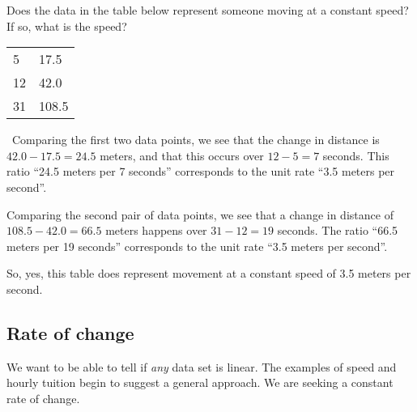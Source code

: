 
\begin{boxex}
Does the data in the table below represent someone moving at a constant speed? If so, what is the speed?

\begin{center}
\begin{tabular}{|C{2cm}|C{2cm}|}
\hline
{} & \\ & 17.5\\
12 & 42.0\\
31 & 108.5\\\hline
\end{tabular}
\end{center}

\exsoln\ Comparing the first two data points, we see that the change in distance is $42.0 - 17.5 = 24.5$ meters, and that this occurs over $12-5=7$ seconds. This ratio ``24.5 meters per 7 seconds'' corresponds to the unit rate ``3.5 meters per second''.

Comparing the second pair of data points, we see that a change in distance of $108.5-42.0 = 66.5$ meters happens over $31-12 = 19$ seconds. The ratio ``66.5 meters per 19 seconds'' corresponds to the unit rate ``3.5 meters per second''.

So, yes, this table does represent movement at a constant speed of 3.5 meters per second.
\end{boxex}


\subsection{Rate of change}

We want to be able to tell if \textit{any} data set is linear. The examples of speed and hourly tuition begin to suggest a general approach. We are seeking a constant \gls{rate of change}.

